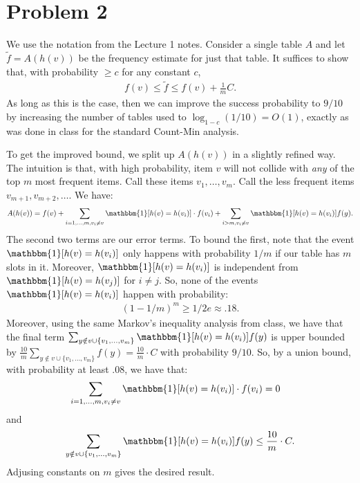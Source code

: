 \documentclass[11pt]{article}
\begin{document}
	
\section*{Problem 2}
	We use the notation from the Lecture 1 notes. Consider a single table $A$ and let $\tilde{f} = A(h(v))$ be the frequency estimate for just that table. It suffices to show that, with probability $\geq c$ for any constant $c$, 
	\begin{align*}
		f(v) \leq \tilde{f} \leq f(v) + \frac{1}{m} C.
	\end{align*}
As long as this is the case, then we can improve the success probability to $9/10$ by increasing the number of tables used to $\log_{1-c}(1/10) = O(1)$, exactly as was done in class for the standard Count-Min analysis. 

To get the improved bound, we split up  $A(h(v))$ in a slightly refined way. The intuition is that, with high probability, item $v$ will not collide with \emph{any} of the top $m$ most frequent items. Call these items $v_1, \ldots, v_m$. Call the less frequent items $v_{m+1}, v_{m+2}, \ldots$. We have:
\begin{align*}
	A(h(v)) = f(v) + \sum_{i=1,\ldots, m, v_i \neq v}\mathbbm{1}[h(v) = h(v_i)]\cdot f(v_i) + \sum_{i> m, v_i \neq v}\mathbbm{1}[h(v) = h(v_i)] f(y).
\end{align*}
The second two terms are our error terms. To bound the first, note that the event $\mathbbm{1}[h(v) = h(v_i)]$ only happens with probability $1/m$ if our table has $m$ slots in it. Moreover, $\mathbbm{1}[h(v) = h(v_i)]$ is independent from $\mathbbm{1}[h(v) = h(v_j)]$ for $i \neq j$. So, none of the events $\mathbbm{1}[h(v) = h(v_i)]$ happen with probability:
\begin{align*}
	(1 - 1/m)^m \geq 1/2e \approx .18.
\end{align*}
Moreover, using the same Markov's inequality analysis from class, we have that the final term $\sum_{y\notin v\cup \{v_1, \ldots, v_m\}}\mathbbm{1}[h(v) = h(v_i)] f(y)$ is upper bounded by $\frac{10}{m} \sum_{y\notin v\cup \{v_1, \ldots, v_m\}}f(y) = \frac{10}{m} \cdot C$ with probability $9/10$. So, by a union bound, with probability at least $.08$, we have that:
\begin{align*}
	\sum_{i=1,\ldots, m, v_i \neq v}\mathbbm{1}[h(v) = h(v_i)]\cdot f(v_i) &= 0
\end{align*}
and 
\begin{align*}
	\sum_{y\notin v\cup \{v_1, \ldots, v_m\}}\mathbbm{1}[h(v) = h(v_i)] f(y) \leq \frac{10}{m} \cdot C.
\end{align*}
Adjusing constants on $m$ gives the desired result. 
\end{document}
